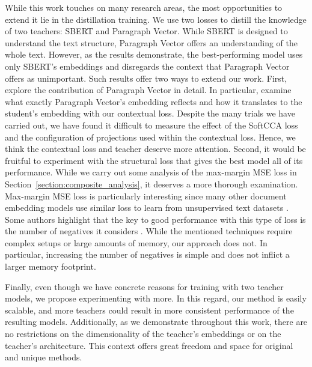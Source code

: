 While this work touches on many research areas, the most opportunities to
extend it lie in the distillation training. We use two losses to distill the
knowledge of two teachers: SBERT and Paragraph Vector. While SBERT is designed
to understand the text structure, Paragraph Vector offers an understanding of
the whole text. However, as the results demonstrate, the best-performing model
uses only SBERT's embeddings and disregards the context that Paragraph Vector
offers as unimportant. Such results offer two ways to extend our work. First,
explore the contribution of Paragraph Vector in detail. In particular, examine
what exactly Paragraph Vector's embedding reflects and how it translates to the
student's embedding with our contextual loss. Despite the many trials we have
carried out, we have found it difficult to measure the effect of the SoftCCA
loss and the configuration of projections used within the contextual loss.
Hence, we think the contextual loss and teacher deserve more attention. Second,
it would be fruitful to experiment with the structural loss that gives the best
model all of its performance. While we carry out some analysis of the
max-margin MSE loss in Section~\ref{section:composite_analysis}, it deserves a
more thorough examination. Max-margin MSE loss is particularly interesting
since many other document embedding models use similar loss to learn from
unsupervised text datasets
\citep{cohan2020specter,ostendorff2022neighborhood,neelakantan2022text,izacard2021unsupervised}.
Some authors highlight that the key to good performance with this type of loss
is the number of negatives it considers
\citep{neelakantan2022text,izacard2021unsupervised}. While the mentioned
techniques require complex setups or large amounts of memory, our approach does
not. In particular, increasing the number of negatives is simple and does not
inflict a larger memory footprint.

Finally, even though we have concrete reasons for training with two teacher
models, we propose experimenting with more. In this regard, our method is
easily scalable, and more teachers could result in more consistent performance
of the resulting models. Additionally, as we demonstrate throughout this work,
there are no restrictions on the dimensionality of the teacher's embeddings or
on the teacher's architecture. This context offers great freedom and space for
original and unique methods.
